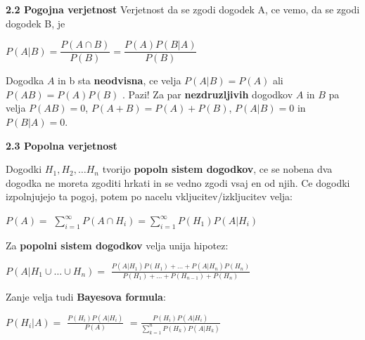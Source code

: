 \documentclass{article}
\begin{document}
\begin{multicols}{2}
\textbf{2.2 Pogojna verjetnost}
Verjetnost da se zgodi dogodek A, ce vemo, da se zgodi dogodek B, je
\begin{center}
    \begin{math}
        P(A | B) = \dfrac{P(A \cap B)}{P(B)} = \dfrac{P(A)P(B|A)}{P(B)}
    \end{math}
\end{center}
Dogodka $A$ in b sta \textbf{neodvisna}, ce velja $P(A | B) = P(A)$ ali
$P(A B) = P(A)P(B)$ .
Pazi! Za par \textbf{nezdruzljivih} dogodkov $A$ in $B$
pa velja $P(AB) = 0$,  $P(A + B) = P(A) + P(B)$, $P(A|B) = 0$ in $P(B|A) = 0$.

\textbf{2.3 Popolna verjetnost}

Dogodki $H_{1}, H_{2}, \dots H_{n}$ tvorijo \textbf{popoln sistem dogodkov},
ce se nobena dva dogodka ne moreta zgoditi hrkati in se vedno
zgodi vsaj en od njih. Ce dogodki izpolnjujejo ta pogoj, potem po
nacelu vkljucitev/izkljucitev velja:
\begin{center}
    \begin{math}
        P(A) =
    \end{math}
    \smallskip
    \begin{math}
        \sum_{i=1}^{\infty} P(A \cap H_{i}) =
        \sum_{i=1}^{\infty} P(H_{1}) P(A | H_{i})
    \end{math}
\end{center}
Za \textbf{popolni sistem dogodkov} velja unija hipotez:
\begin{center}
    \begin{math}
        P(A|H_{1} \cup \dots \cup H_{n}) = 
    \end{math}
    \bigskip
    \begin{math}
        \frac{
            P(A | H_{1}) P(H_{1}) + \dots +
            P(A | H_{n}) P(H_{n})
        }
        {
            P(H_{1}) + \dots + P(H_{n - 1}) + P(H_{n})
        }
    \end{math}    
\end{center}
Zanje velja tudi \textbf{Bayesova formula}:
\begin{center}
    \begin{math}
        P(H_{i} | A) = 
    \end{math}
    \begin{math}
        \frac{
            P(H_{i}) P(A | H_{i})
        }
        {
            P(A)
        }
    \end{math}
    \begin{math}
        = \frac{
            P(H_{i}) P(A | H_{i})
        }
        {
            \sum_{k=1}^{n} P(H_{k}) P(A | H_{k})
        }
    \end{math}        
\end{center}


\end{multicols}
\end{document}
